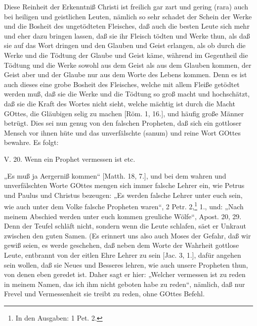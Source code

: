 Diese Reinheit der Erkenntniß Christi ist freilich gar zart und gering (rara) auch bei heiligen und geistlichen Leuten, nämlich so sehr schadet der Schein der Werke und die Bosheit des ungetödteten Fleisches, daß auch die besten Leute sich mehr und eher dazu bringen lassen, daß sie ihr Fleisch tödten und Werke thun, als daß sie auf das Wort dringen und den Glauben und Geist erlangen, als ob durch die Werke und die Tödtung der Glaube und Geist käme, während im Gegentheil die Tödtung und die Werke sowohl aus dem Geist als aus dem Glauben kommen, der Geist aber und der Glaube nur aus dem Worte des Lebens kommen. Denn es ist auch dieses eine grobe Bosheit des Fleisches, welche mit allem Fleiße getödtet werden muß, daß sie die Werke und die Tödtung so groß macht und hochschätzt, daß sie die Kraft des Wortes nicht sieht, welche mächtig ist durch die Macht GOttes, die Gläubigen selig zu machen [Röm. 1, 16.], und häufig große Männer betrügt. Dies sei nun genug von den falschen Propheten, daß sich ein gottloser Mensch vor ihnen hüte und das unverfälschte (sanum) und reine Wort GOttes bewahre. Es folgt:

\begin{schriftzitat}
V. 20. Wenn ein Prophet vermessen ist etc.
\end{schriftzitat}

„Es muß ja Aergerniß kommen“ [Matth. 18, 7.], und bei dem wahren und unverfälschten Worte GOttes mengen sich immer falsche Lehrer ein, wie Petrus und Paulus und Christus bezeugen: „Es werden falsche Lehrer unter euch sein, wie auch unter dem Volke falsche Propheten waren“, 2 Petr. 2,\footnote{In den Ausgaben: 1 Pet. 2.} 1., und: „Nach meinem Abschied werden unter euch kommen greuliche Wölfe“, Apost. 20, 29. Denn der Teufel schläft nicht, sondern wenn die Leute schlafen, säet er Unkraut zwischen den guten Samen. (Es erinnert uns also auch Moses der Gefahr,
daß wir gewiß seien, es werde geschehen, daß neben dem Worte der Wahrheit gottlose Leute, entbrannt von der eitlen Ehre Lehrer zu sein [Jac. 3, 1.], dafür angehen sein wollen, daß sie Neues und Besseres lehren, wie auch unsere Propheten thun, von denen eben geredet ist. Daher sagt er hier: „Welcher vermessen ist zu reden in meinem Namen, das ich ihm nicht geboten habe zu reden“, nämlich, daß nur Frevel und Vermessenheit sie treibt zu reden, ohne GOttes Befehl.

